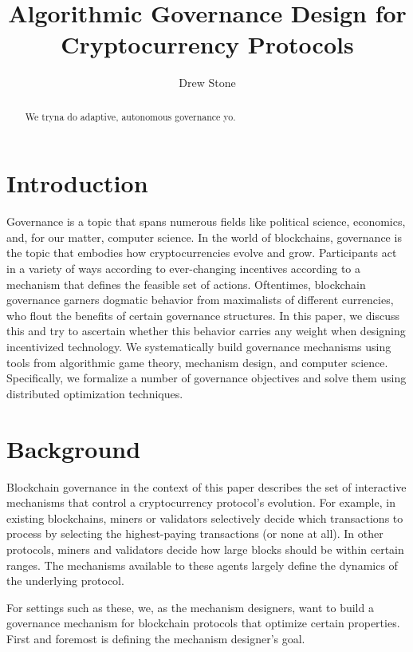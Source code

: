 \documentclass{article}
\title{Algorithmic Governance Design for Cryptocurrency Protocols}
\author{Drew Stone}
\theoremstyle{definition}
\theoremstyle{definition}
\newcounter{protocol}
\begin{document}
\maketitle
\begin{abstract}
We tryna do adaptive, autonomous governance yo.
\end{abstract}
\section{Introduction}
Governance is a topic that spans numerous fields like political science, economics, and, for our matter, computer science. In the world of blockchains, governance is the topic that embodies how cryptocurrencies evolve and grow. Participants act in a variety of ways according to ever-changing incentives according to a mechanism that defines the feasible set of actions. Oftentimes, blockchain governance garners dogmatic behavior from maximalists of different currencies, who flout the benefits of certain governance structures. In this paper, we discuss this and try to ascertain whether this behavior carries any weight when designing incentivized technology. We systematically build governance mechanisms using tools from algorithmic game theory, mechanism design, and computer science. Specifically, we formalize a number of governance objectives and solve them using distributed optimization techniques.

\section{Background}
Blockchain governance in the context of this paper describes the set of interactive mechanisms that control a cryptocurrency protocol's evolution. For example, in existing blockchains, miners or validators selectively decide which transactions to process by selecting the highest-paying transactions (or none at all). In other protocols, miners and validators decide how large blocks should be within certain ranges. The mechanisms available to these agents largely define the dynamics of the underlying protocol.

For settings such as these, we, as the mechanism designers, want to build a governance mechanism for blockchain protocols that optimize certain properties. First and foremost is defining the mechanism designer's goal.
\end{document}

